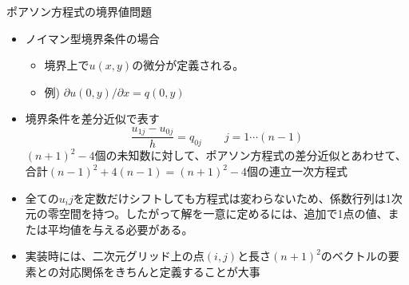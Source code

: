 \begin{frame}[t,fragile]{ポアソン方程式の境界値問題}
  \begin{itemize}
  \item ノイマン型境界条件の場合
    \begin{itemize}
    \item 境界上で$u(x,y)$の微分が定義される。
    \item 例) $\partial u(0,y) / \partial x = q(0,y)$
    \end{itemize}
  \item 境界条件を差分近似で表す
    \[
    \frac{u_{1j} - u_{0j}}{h} = q_{0j} \qquad j=1 \cdots (n-1)
    \]
    $(n+1)^2-4$個の未知数に対して、ポアソン方程式の差分近似とあわせて、合計$(n-1)^2+4(n-1)=(n+1)^2-4$個の連立一次方程式
  \item 全ての$u_ij$を定数だけシフトしても方程式は変わらないため、係数行列は1次元の零空間を持つ。したがって解を一意に定めるには、追加で1点の値、または平均値を与える必要がある。\\[1em]
  \item 実装時には、二次元グリッド上の点$(i,j)$と長さ$(n+1)^2$のベクトルの要素との対応関係をきちんと定義することが大事
  \end{itemize}
\end{frame}
